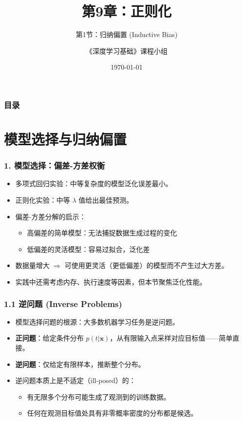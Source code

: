 \documentclass[t,aspectratio=169]{beamer} %
\title[9.1.归纳偏置]{第9章：正则化}
\subtitle{第1节：归纳偏置 (Inductive Bias)}
\author{《深度学习基础》课程小组}
\date{\today}
\begin{document}
\frame{\titlepage}

\begin{frame}
    \frametitle{目录}
    \tableofcontents
\end{frame}

\section{模型选择与归纳偏置}

\begin{frame}
    \frametitle{1. 模型选择：偏差-方差权衡}
    \begin{itemize}
        \item 多项式回归实验：\alert{中等复杂度}的模型泛化误差最小。
        \item 正则化实验：\alert{中等 $\lambda$ 值}给出最佳预测。
        \item 偏差-方差分解的启示：
        \begin{itemize}
            \item \alert{高偏差}的简单模型：无法捕捉数据生成过程的变化
            \item \alert{低偏差}的灵活模型：容易过拟合，泛化差
        \end{itemize}
        \item 数据量增大 $\Rightarrow$ 可使用更灵活（更低偏差）的模型而不产生过大方差。
        \item 实践中还需考虑内存、执行速度等因素，但本节聚焦\alert{泛化性能}。
    \end{itemize}
\end{frame}

\begin{frame}
    \frametitle{1.1 逆问题 (Inverse Problems)}
    \begin{itemize}
        \item 模型选择问题的根源：大多数机器学习任务是\alert{逆问题}。
        \item \textbf{正问题}：给定条件分布 $p(t|\mathbf{x})$，从有限输入点采样对应目标值——简单直接。
        \item \textbf{逆问题}：仅给定有限样本，\alert{推断整个分布}。
        \item 逆问题本质上是\alert{不适定}（ill-posed）的：
        \begin{itemize}
            \item 有无限多个分布可能生成了观测到的训练数据。
            \item 任何在观测目标值处具有非零概率密度的分布都是候选。
        \end{itemize}
    \end{itemize}
\end{frame}
\end{document}
